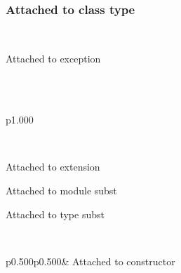 \label{Labels-class-c}\\
\label{Labels-class-type-cs}\begin{ocamlindent}\subsubsection{Attached to class type\label{L8}}%
\end{ocamlindent}%
\\
\label{Labels-exception-E}\begin{ocamlindent}Attached to exception\end{ocamlindent}%
\medbreak
\label{Labels-type-x}\\
\label{Labels-extension-decl-X}\\
\begin{ocamltabular}{p{1.000\textwidth}}\label{Labels-extension-X}\\
\end{ocamltabular}%
\\
\begin{ocamlindent}Attached to extension\end{ocamlindent}%
\medbreak
\label{Labels-module-S}\begin{ocamlindent}Attached to module subst\end{ocamlindent}%
\medbreak
\label{Labels-type-s}\begin{ocamlindent}Attached to type subst\end{ocamlindent}%
\medbreak
\label{Labels-type-u}\\
\begin{ocamltabular}{p{0.500\textwidth}p{0.500\textwidth}}\label{Labels-type-u.A'}& Attached to constructor\\
\end{ocamltabular}%

